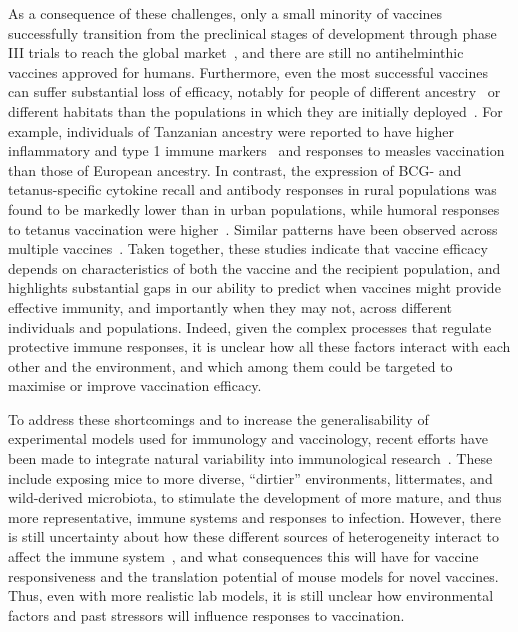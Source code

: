\documentclass[a4paper, hidelinks, 11pt]{article}
\begin{document}
As a consequence of these challenges, only a small minority of vaccines successfully transition from the preclinical stages of development through phase III trials to reach the global market~\cite{Pronker2013}, and there are still no antihelminthic vaccines approved for humans. Furthermore, even the most successful vaccines can suffer substantial loss of efficacy, notably for people of different ancestry~\cite{Schaid2017} or different habitats than the populations in which they are initially deployed~\cite{vanDorst2024}. For example, individuals of Tanzanian ancestry were reported to have higher inflammatory and type 1 immune markers~\cite{Boahen2022} and responses to measles vaccination~\cite{Voigt2016} than those of European ancestry. In contrast, the expression of BCG- and tetanus-specific cytokine recall and antibody responses in rural populations was found to be markedly lower than in urban populations, while humoral responses to tetanus vaccination were higher~\cite{Zimmermann2019,Kabagenyi2020}. Similar patterns have been observed across multiple vaccines~\cite{vanDorst2024}. Taken together, these studies indicate that vaccine efficacy depends on characteristics of both the vaccine and the recipient population, and highlights substantial gaps in our ability to predict when vaccines might provide effective immunity, and importantly when they may not, across different individuals and populations. Indeed, given the complex processes that regulate protective immune responses, it is unclear how all these factors interact with each other and the environment, and which among them could be targeted to maximise or improve vaccination efficacy.

To address these shortcomings and to increase the generalisability of experimental models used for immunology and vaccinology, recent efforts have been made to integrate natural variability into immunological research~\cite{Babayan2011,Beura2016,Graham2021,Rosshart2017,Rosshart2019}. These include exposing mice to more diverse, ``dirtier'' environments, littermates, and wild-derived microbiota, to stimulate the development of more mature, and thus more representative, immune systems and responses to infection. However, there is still uncertainty about how these different sources of heterogeneity interact to affect the immune system~\cite{Mangino2017}, and what consequences this will have for vaccine responsiveness and the translation potential of mouse models for novel vaccines. Thus, even with more realistic lab models, it is still unclear how environmental factors and past stressors will influence responses to vaccination.
\end{document}
